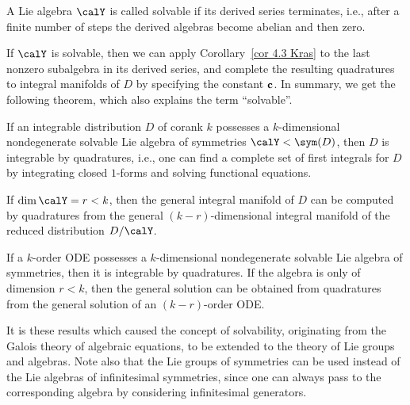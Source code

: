 \begin{defn}
    A Lie algebra $\calY$ is called solvable if its derived series terminates, i.e., after a finite number of steps the derived algebras become abelian and then zero.
\end{defn}

If $\calY$ is solvable, then we can apply Corollary~\ref{cor 4.3 Kras} to the last nonzero subalgebra in its derived series, and complete the resulting quadratures to integral manifolds of $D$ by specifying the constant $\bf{c}$. In summary, we get the following theorem, which also explains the term ``solvable''.

\begin{thm}\label{thm 4.4 Kras}
    If an integrable distribution $D$ of corank $k$ possesses a $k$-dimensional nondegenerate solvable Lie algebra of symmetries $\calY<\sym(D)$, then $D$ is integrable by quadratures, i.e., one can find a complete set of first integrals for $D$ by integrating closed $1$-forms and solving functional equations.

    If $\dim \calY=r<k$, then the general integral manifold of $D$ can be computed by quadratures from the general $(k-r)$-dimensional integral manifold of the reduced distribution $D\slash \calY$.
\end{thm}

\begin{thm}
    If a $k$-order ODE possesses a $k$-dimensional nondegenerate solvable Lie algebra of symmetries, then it is integrable by quadratures. If the algebra is only of dimension $r<k$, then the general solution can be obtained from quadratures from the general solution of an $(k-r)$-order ODE.
\end{thm}

It is these results which caused the concept of solvability, originating from the Galois theory of algebraic equations, to be extended to the theory of Lie groups and algebras. Note also that the Lie groups of symmetries can be used instead of the Lie algebras of infinitesimal symmetries, since one can always pass to the corresponding algebra by considering infinitesimal generators.

